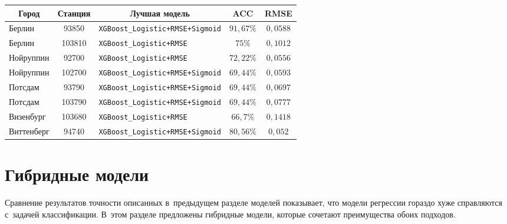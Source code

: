\begin{multicols}{2}
\begin{table*}
\begin{center}
\begin{tabular}{|l|c|l|c|c|}
\hline
\multicolumn{1}{|c|}{{\bf Город}} & 
\multicolumn{1}{c|}{{\bf Станция}} & 
\multicolumn{1}{c|}{{\bf Лучшая модель}} & 
{\bf ACC}& {\bf RMSE} \\
\hline
      Берлин &   \hphantom{9}93850 &  \verb"XGBoost_Logistic+RMSE+Sigmoid" &  $91{,}67\%$ &  $0{,}0588$ \\
      Берлин &  103810 &          \verb"XGBoost_Logistic+RMSE" & $ 75\%$\hphantom{,99} &  $0{,}1012$ \\
   Нойруппин &   \hphantom{9}92700 &          \verb"XGBoost_Logistic+RMSE" &  $72{,}22 \%$& $ 0{,}0556$ \\
   Нойруппин &  102700 &  \verb"XGBoost_Logistic+RMSE+Sigmoid" &  $69{,}44 \%$&  $0{,}0593$ \\
     Потсдам &   \hphantom{9}93790 &  \verb"XGBoost_Logistic+RMSE+Sigmoid" &  $69{,}44\%$ &  $0{,}0697$ \\
     Потсдам &  103790 &  \verb"XGBoost_Logistic+RMSE+Sigmoid" & $69{,}44\%$ &  $0{,}0777$ \\
  Визенбург &  103680 &          \verb"XGBoost_Logistic+RMSE" &  $66{,}7\%$\hphantom{9} &  $0{,}1418$ \\
  Виттенберг &   \hphantom{9}94740 &  \verb"XGBoost_Logistic+RMSE+Sigmoid" &  $80{,}56\%$ &  $0{,}052$\hphantom{9} \\
\hline
\end{tabular}
\end{center}
\end{table*}


\section{Гибридные модели}

Сравнение результатов точности описанных в~предыдущем разделе моделей показывает, 
что модели регрессии гораздо хуже справляются с~задачей классификации. 
В~этом разделе предложены гиб\-рид\-ные модели, которые сочетают преимущества 
обоих подходов.


\end{multicols}
